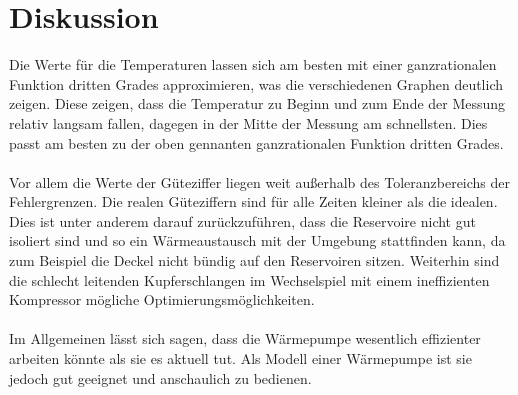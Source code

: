 \section{Diskussion}
Die Werte für die Temperaturen lassen sich am besten mit einer ganzrationalen
Funktion dritten Grades approximieren, was die verschiedenen Graphen deutlich zeigen.
Diese zeigen, dass die Temperatur zu Beginn und zum Ende der Messung relativ langsam
fallen, dagegen in der Mitte der Messung am schnellsten. Dies passt am besten zu der
oben gennanten ganzrationalen Funktion dritten Grades.
\\
\\
Vor allem die Werte der Güteziffer liegen weit außerhalb des Toleranzbereichs
der Fehlergrenzen. Die realen Güteziffern sind für alle Zeiten kleiner als die
idealen. Dies ist unter anderem darauf zurückzuführen, dass die Reservoire nicht
gut isoliert sind und so ein Wärmeaustausch mit der Umgebung stattfinden kann,
da zum Beispiel die Deckel nicht bündig auf den Reservoiren sitzen.
Weiterhin sind die schlecht leitenden Kupferschlangen im Wechselspiel mit einem
ineffizienten Kompressor mögliche Optimierungsmöglichkeiten.
\\
\\
Im Allgemeinen lässt sich sagen, dass die Wärmepumpe wesentlich effizienter arbeiten
könnte als sie es aktuell tut. Als Modell einer Wärmepumpe ist sie jedoch gut geeignet
und anschaulich zu bedienen.
\newpage
\nocite{*}
\printbibliography
